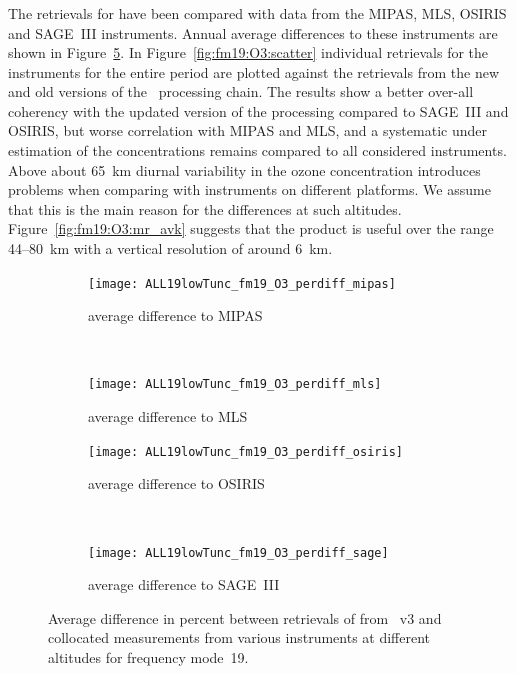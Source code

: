 \subsubsection{}
\label{sec:fm19:comparison:O3}
The retrievals for  have been compared with data from the MIPAS, MLS,
OSIRIS and SAGE~III instruments. Annual average differences to these
instruments are shown in Figure~\ref{fig:fm19:O3:profiles}. In
Figure~\ref{fig:fm19:O3:scatter} individual retrievals for the instruments for
the entire period are plotted against the retrievals from the new and old
versions of the \smr\ processing chain. The results show a better over-all
coherency with the updated version of the processing compared to SAGE~III and
OSIRIS, but worse correlation with MIPAS and MLS, and a systematic under
estimation of the concentrations remains compared to all considered
instruments.  Above about 65~km diurnal variability in the ozone concentration
introduces problems when comparing with instruments on different platforms. We
assume that this is the main reason for the differences at such altitudes.
Figure~\ref{fig:fm19:O3:mr_avk} suggests that the product is useful over the
range 44--80~km with a vertical resolution of around 6~km.


\begin{figure}[tbhp]
    \centering
    \begin{subfigure}[b]{0.49\textwidth}
        \texttt{[image: ALL19lowTunc\_fm19\_O3\_perdiff\_mipas]}
        \caption{average difference to MIPAS}
        \label{fig:fm19:O3:profiles:MIPAS}
    \end{subfigure}
    \,
    \begin{subfigure}[b]{0.49\textwidth}
        \texttt{[image: ALL19lowTunc\_fm19\_O3\_perdiff\_mls]}
        \caption{average difference to MLS}
        \label{fig:fm19:O3:profiles:MLS}
    \end{subfigure}

    \begin{subfigure}[b]{0.49\textwidth}
        \texttt{[image: ALL19lowTunc\_fm19\_O3\_perdiff\_osiris]}
        \caption{average difference to OSIRIS}
        \label{fig:fm19:O3:profiles:OSIRIS}
    \end{subfigure}
    \,
    \begin{subfigure}[b]{0.49\textwidth}
        \texttt{[image: ALL19lowTunc\_fm19\_O3\_perdiff\_sage]}
        \caption{average difference to SAGE~III}
        \label{fig:fm19:O3:profiles:SAGEIII}
    \end{subfigure}
    \caption{Average difference in percent between retrievals of 
    from \smr~v3 and collocated measurements from various instruments at
    different altitudes for frequency mode~19.}

    \label{fig:fm19:O3:profiles}
\end{figure}


